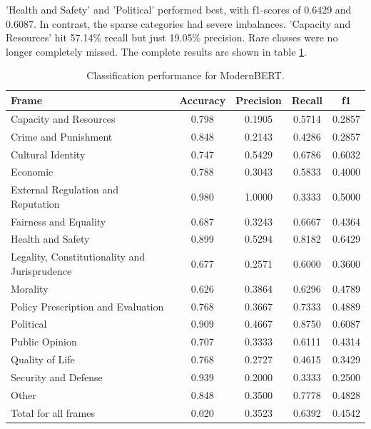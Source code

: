 \documentclass[
10pt, %
a4paper, %
oneside, %
headinclude,footinclude, %
] {book}%
\begin{document}
'Health and Safety' and 'Political' performed best, with f1-scores of 0.6429 and 0.6087. In contrast, the sparse categories had severe imbalances. 'Capacity and Resources' hit 57.14\% recall but just 19.05\% precision. Rare classes were no longer completely missed. The complete results are shown in table \ref{tab:modernbert_classification}.



\begin{table}[htbp]
\small
\centering
\begin{tabular}{|l|c|c|c|c|}
\hline
\textbf{Frame} & \textbf{Accuracy} & \textbf{Precision} & \textbf{Recall} & \textbf{f1} \\
\hline
Capacity and Resources & 0.798 & 0.1905 & 0.5714 & 0.2857 \\\hline
Crime and Punishment & 0.848 & 0.2143 & 0.4286 & 0.2857 \\\hline
Cultural Identity & 0.747 & 0.5429 & 0.6786 & 0.6032 \\\hline
Economic & 0.788 & 0.3043 & 0.5833 & 0.4000 \\\hline
External Regulation and Reputation & 0.980 & 1.0000 & 0.3333 & 0.5000 \\\hline
Fairness and Equality & 0.687 & 0.3243 & 0.6667 & 0.4364 \\\hline
Health and Safety & 0.899 & 0.5294 & 0.8182 & 0.6429 \\\hline
Legality, Constitutionality and Jurisprudence & 0.677 & 0.2571 & 0.6000 & 0.3600 \\\hline
Morality & 0.626 & 0.3864 & 0.6296 & 0.4789 \\\hline
Policy Prescription and Evaluation & 0.768 & 0.3667 & 0.7333 & 0.4889 \\\hline
Political & 0.909 & 0.4667 & 0.8750 & 0.6087 \\\hline
Public Opinion & 0.707 & 0.3333 & 0.6111 & 0.4314 \\\hline
Quality of Life & 0.768 & 0.2727 & 0.4615 & 0.3429 \\\hline
Security and Defense & 0.939 & 0.2000 & 0.3333 & 0.2500 \\
\hline
Other & 0.848 & 0.3500 & 0.7778 & 0.4828 \\\hline
Total for all frames & 0.020 & 0.3523 & 0.6392 & 0.4542 \\
\hline
\end{tabular}
\caption{Classification performance for ModernBERT.}
\label{tab:modernbert_classification}
\end{table}
    
\end{document}
